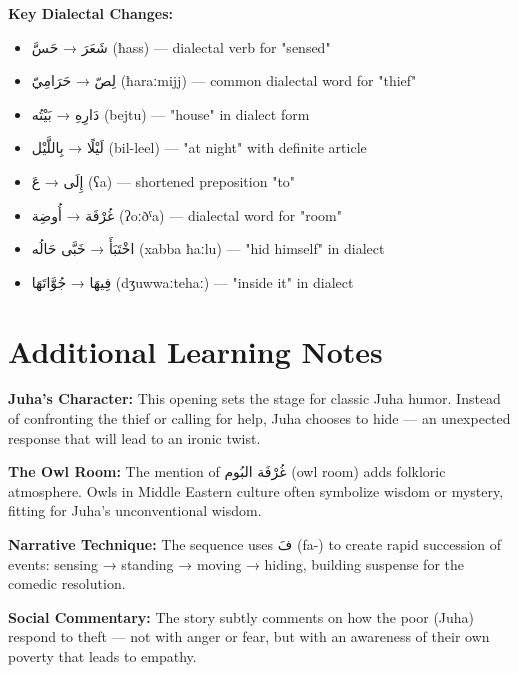 \documentclass[letter,12pt]{article}
\begin{document}
\textbf{Key Dialectal Changes:}
\begin{itemize}
\item \textarabic{شَعَرَ} → \textarabic{حَسَّ} (ħass) — dialectal verb for "sensed"
\item \textarabic{لِصّ} → \textarabic{حَرَامِيّ} (ħaraːmijj) — common dialectal word for "thief"
\item \textarabic{دَارِهِ} → \textarabic{بَيْتُه} (bejtu) — "house" in dialect form
\item \textarabic{لَيْلًا} → \textarabic{بِاللَّيْل} (bil-leel) — "at night" with definite article
\item \textarabic{إِلَى} → \textarabic{عَ} (ʕa) — shortened preposition "to"
\item \textarabic{غُرْفَة} → \textarabic{أُوضِة} (ʔoːðˤa) — dialectal word for "room"
\item \textarabic{اخْتَبَأَ} → \textarabic{خَبَّى حَالُه} (xabba ħaːlu) — "hid himself" in dialect
\item \textarabic{فِيهَا} → \textarabic{جُوَّاتَهَا} (dʒuwwaːtehaː) — "inside it" in dialect
\end{itemize}

\section{Additional Learning Notes}

\begin{tcolorbox}[colback=boxcolor,colframe=accentcolor,title=\textbf{Cultural and Literary Context},breakable]
\textbf{Juha's Character:} This opening sets the stage for classic Juha humor. Instead of confronting the thief or calling for help, Juha chooses to hide — an unexpected response that will lead to an ironic twist.

\textbf{The Owl Room:} The mention of \textarabic{غُرْفَة البُوم} (owl room) adds folkloric atmosphere. Owls in Middle Eastern culture often symbolize wisdom or mystery, fitting for Juha's unconventional wisdom.

\textbf{Narrative Technique:} The sequence uses \textarabic{فَ} (fa-) to create rapid succession of events: sensing → standing → moving → hiding, building suspense for the comedic resolution.

\textbf{Social Commentary:} The story subtly comments on how the poor (Juha) respond to theft — not with anger or fear, but with an awareness of their own poverty that leads to empathy.
\end{tcolorbox}
\end{document}
